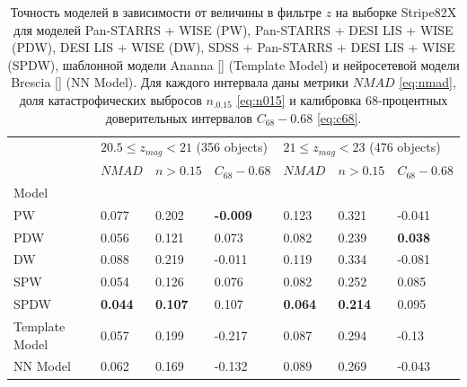 \documentclass[fleqn,usenatbib]{mnras}
\begin{document}
\begin{table}
	\begin{tabular}{lllllll}
            \hline
            {} & \multicolumn{3}{l}{$20.5 \leq z_{mag} < 21$ (356 objects)} & \multicolumn{3}{l}{$21 \leq z_{mag} < 23$ (476 objects)} \\
            {} &                                 $NMAD$ &        $n>0.15$ &  $C_{68} - 0.68$ &                               $NMAD$ &        $n>0.15$ & $C_{68} - 0.68$ \\
            Model          &                                        &                 &                  &                                      &                 &                 \\
            \hline
            PW             &                                  0.077 &           0.202 &  \textbf{-0.009} &                                0.123 &           0.321 &          -0.041 \\
            PDW            &                                  0.056 &           0.121 &            0.073 &                                0.082 &           0.239 &  \textbf{0.038} \\
            DW             &                                  0.088 &           0.219 &           -0.011 &                                0.119 &           0.334 &          -0.081 \\
            SPW            &                                  0.054 &           0.126 &            0.076 &                                0.082 &           0.252 &            0.085 \\
            SPDW           &                         \textbf{0.044} &  \textbf{0.107} &            0.107 &                       \textbf{0.064} &  \textbf{0.214} &           0.095 \\
            Template Model &                                  0.057 &           0.199 &           -0.217 &                                0.087 &           0.294 &           -0.13 \\
            NN Model       &                                  0.062 &           0.169 &           -0.132 &                                0.089 &           0.269 &          -0.043 \\
            \hline
            \end{tabular}
            \caption{Точность моделей в зависимости от величины в фильтре $z$ на выборке Stripe82X для моделей Pan-STARRS + WISE (PW), Pan-STARRS + DESI LIS + WISE (PDW), DESI LIS + WISE (DW), SDSS + Pan-STARRS + DESI LIS + WISE (SPDW), шаблонной модели Ananna \ref{} (Template Model) и нейросетевой модели Brescia \ref{} (NN Model). Для каждого интервала даны метрики $NMAD$ \eqref{eq:nmad}, доля катастрофических выбросов $n_{.0.15}$ \eqref{eq:n015} и калибровка 68-процентных доверительных интервалов $C_{68} - 0.68$ \eqref{eq:c68}.}
\end{table}
\end{document}
